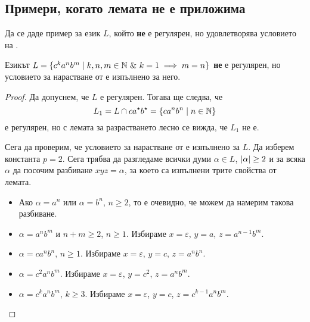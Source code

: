 \subsection*{Примери, когато лемата не е  приложима}

\begin{problem}
  Да се даде пример за език $L$, който {\bf не} е регулярен, но удовлетворява
  условието на .
\end{problem}

\begin{example}
  Езикът $L = \{c^ka^nb^m\mid k,n,m \in \Nat\ \&\ k = 1\implies m = n\}$
  {\bf не} е регулярен, но условието за нарастване от  е изпълнено за него.
\end{example}
\begin{proof}
  Да допуснем, че $L$ е регулярен.
  Тогава ще следва, че 
  \[L_1 = L\cap ca^\star b^\star = \{ca^nb^n \mid n\in\mathbb{N}\}\]
  е регулярен,
  но с лемата за разрастването лесно се вижда, че $L_1$ не е.

  Сега да проверим, че условието за нарастване от  е изпълнено за $L$.
  Да изберем константа $p = 2$.
  Сега трябва да разгледаме всички думи $\alpha \in L$, $\lvert{\alpha}\rvert \geq 2$
  и за всяка $\alpha$ да посочим разбиване $xyz = \alpha$, за което са изпълнени трите свойства от лемата.

  \begin{itemize}
  \item
    Ако $\alpha = a^n$ или $\alpha = b^n$, $n\geq 2$, то е  очевидно, че можем да
    намерим такова разбиване.
  \item
    $\alpha = a^nb^m$ и $n+m \geq 2$, $n \geq 1$.
    Избираме $x = \varepsilon$, $y = a$, $z = a^{n-1}b^m$.
  \item
    $\alpha = ca^nb^n$, $n\geq 1$.
    Избираме $x = \varepsilon$, $y = c$, $z = a^nb^n$.
  \item
    $\alpha = c^2a^nb^m$. 
    Избираме $x = \varepsilon$, $y = c^2$, $z = a^nb^m$.
  \item
    $\alpha = c^ka^nb^m$, $k \geq 3$.
    Избираме $x = \varepsilon$, $y = c$, $z = c^{k-1}a^nb^m$.
  \end{itemize}
\end{proof}

